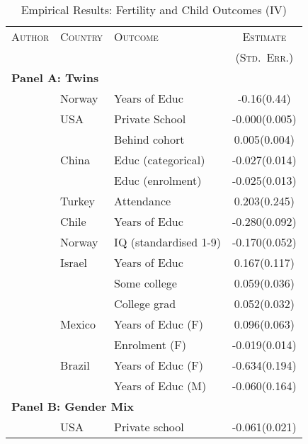 \begin{table}[htpb!]
\caption{Empirical Results: Fertility and Child Outcomes (IV)}
\label{Ftab:childQQ}
\begin{tabular}{lllc} \toprule
\textsc{Author} & \textsc{Country} & \textsc{Outcome} & \textsc{Estimate} \\
                &                  &                  & \textsc{(Std.\ Err.)} \\ \midrule
\multicolumn{4}{l}{\textbf{Panel A: Twins}} \\
\citet{Blacketal2005}            &Norway   &Years of Educ        &-0.16(0.44) \\
\citet{Caceres2006}              &USA      &Private School       &-0.000(0.005)\\
                                 &         &Behind cohort        & 0.005(0.004)\\
\citet{Lietal2008}               &China    &Educ (categorical)   &-0.027(0.014)\\
                                 &         &Educ (enrolment)    &-0.025(0.013)\\
\citet{Dayiogluetal2009}         &Turkey   &Attendance           & 0.203(0.245)\\
\citet{Sanhueza2009}             &Chile    &Years of Educ        &-0.280(0.092)\\
\citet{Blacketal2010}            &Norway   &IQ (standardised 1-9)&-0.170(0.052)\\
\citet{Angristetal2010}          &Israel   &Years of Educ        & 0.167(0.117)\\
                                 &         &Some college         & 0.059(0.036)\\
                                 &         &College grad         & 0.052(0.032)\\
\citet{FitzsimonsMalde2010}      &Mexico   &Years of Educ (F)    & 0.096(0.063)\\
                                 &         &Enrolment (F)        &-0.019(0.014)\\
\citet{SouzaPonczek2012}         &Brazil   &Years of Educ (F)    &-0.634(0.194)\\
                                 &         &Years of Educ (M)    &-0.060(0.164)\\ \midrule
\multicolumn{4}{l}{\textbf{Panel B: Gender Mix}} \\
\citet{ConleyGlauber2006}        &USA      &Private school       &-0.061(0.021) \\

\end{tabular}
\end{table}
